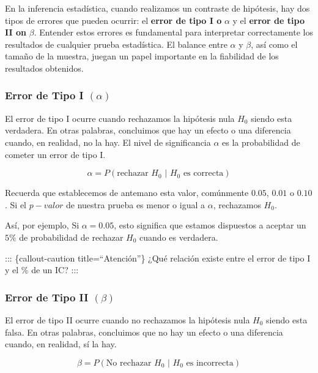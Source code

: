 \documentclass[
  letterpaper,
  DIV=11,
  numbers=noendperiod]{scrreprt}
\begin{document}
En la inferencia estadística, cuando realizamos un contraste de
hipótesis, hay dos tipos de errores que pueden ocurrir: el \textbf{error
de tipo I o} \(\alpha\) y el \textbf{error de tipo II on} \(\beta\).
Entender estos errores es fundamental para interpretar correctamente los
resultados de cualquier prueba estadística. El balance entre \(\alpha\)
y \(\beta\), así como el tamaño de la muestra, juegan un papel
importante en la fiabilidad de los resultados obtenidos.

\hypertarget{error-de-tipo-i-alpha}{%
\subsubsection{\texorpdfstring{Error de Tipo I
\((\alpha)\)}{Error de Tipo I (\textbackslash alpha)}}\label{error-de-tipo-i-alpha}}

El error de tipo I ocurre cuando rechazamos la hipótesis nula \(H_0\)
siendo esta verdadera. En otras palabras, concluimos que hay un efecto o
una diferencia cuando, en realidad, no la hay. El nivel de significancia
\(\alpha\) es la probabilidad de cometer un error de tipo I.

\[
\alpha=P(\text{rechazar } H_0 \text{ | } H_0 \text{ es correcta})
\]

Recuerda que establecemos de antemano esta valor, comúnmente \(0.05\),
\(0.01\) o \(0.10\). Si el \(p-valor\) de nuestra prueba es menor o
igual a \(\alpha\), rechazamos \(H_0\).

Así, por ejemplo, Si \(\alpha = 0.05\), esto significa que estamos
dispuestos a aceptar un \(5\%\) de probabilidad de rechazar \(H_0\)
cuando es verdadera.

::: \{callout-caution title=``Atención''\} ¿Qué relación existe entre el
error de tipo I y el \(\%\) de un IC? :::

\hypertarget{error-de-tipo-ii-beta}{%
\subsubsection{\texorpdfstring{Error de Tipo II
\((\beta)\)}{Error de Tipo II (\textbackslash beta)}}\label{error-de-tipo-ii-beta}}

El error de tipo II ocurre cuando no rechazamos la hipótesis nula
\(H_0\) siendo esta falsa. En otras palabras, concluimos que no hay un
efecto o una diferencia cuando, en realidad, sí la hay.

\[
\beta=P(\text{No rechazar } H_0 \text{ | } H_0 \text{ es incorrecta})
\]
\end{document}
